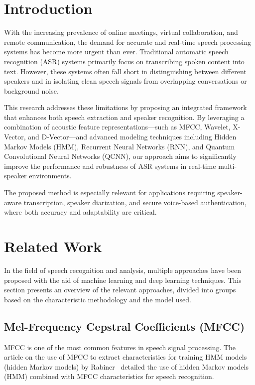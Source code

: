 \documentclass[conference]{IEEEtran}
\begin{document}
\section{Introduction}

With the increasing prevalence of online meetings, virtual collaboration, and remote communication, the demand for accurate and real-time speech processing systems has become more urgent than ever. Traditional automatic speech recognition (ASR) systems primarily focus on transcribing spoken content into text. However, these systems often fall short in distinguishing between different speakers and in isolating clean speech signals from overlapping conversations or background noise.

This research addresses these limitations by proposing an integrated framework that enhances both speech extraction and speaker recognition. By leveraging a combination of acoustic feature representations—such as MFCC, Wavelet, X-Vector, and D-Vector—and advanced modeling techniques including Hidden Markov Models (HMM), Recurrent Neural Networks (RNN), and Quantum Convolutional Neural Networks (QCNN), our approach aims to significantly improve the performance and robustness of ASR systems in real-time multi-speaker environments.

The proposed method is especially relevant for applications requiring speaker-aware transcription, speaker diarization, and secure voice-based authentication, where both accuracy and adaptability are critical.

\section{Related Work}

In the field of speech recognition and analysis, multiple approaches have been proposed with the aid of machine learning and deep learning techniques. This section presents an overview of the relevant approaches, divided into groups based on the characteristic methodology and the model used.

\subsection{Mel-Frequency Cepstral Coefficients (MFCC)}

MFCC is one of the most common features in speech signal processing. The article on the use of MFCC to extract characteristics for training HMM models (hidden Markov models) by Rabiner~\cite{rabiner1989tutorial} detailed the use of hidden Markov models (HMM) combined with MFCC characteristics for speech recognition.
\end{document}
